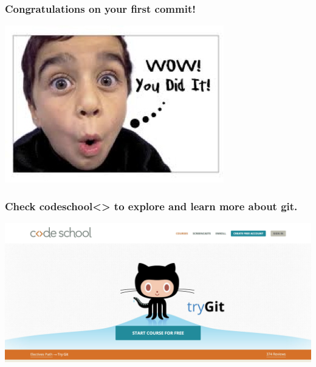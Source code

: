 \documentclass{beamer}
\begin{document}
\begin{frame}
\frametitle{ Congratulations on your first commit!}
\includegraphics[scale=0.8]{ydi.jpg}
\end{frame}

\begin{frame}
\frametitle{ Check codeschool<> to explore and learn more about git.}
\includegraphics[scale=0.2]{codeschool.png}
\end{frame}
\end{document}
